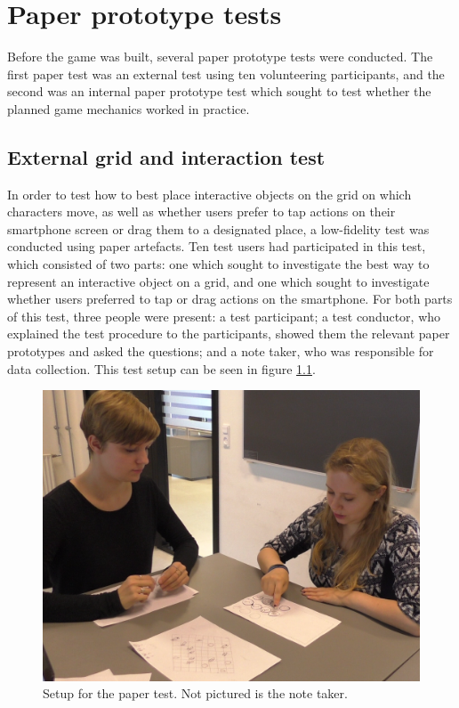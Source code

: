 \chapter{Paper prototype tests}\label{ch:paperPlaytest}
Before the game was built, several paper prototype tests were conducted. The first paper test was an external test using ten volunteering participants, and the second was an internal paper prototype test which sought to test whether the planned game mechanics worked in practice.

\section{External grid and interaction test}
In order to test how to best place interactive objects on the grid on which characters move, as well as whether users prefer to tap actions on their smartphone screen or drag them to a designated place, a low-fidelity test was conducted using paper artefacts. Ten test users had participated in this test, which consisted of two parts: one which sought to investigate the best way to represent an interactive object on a grid, and one which sought to investigate whether users preferred to tap or drag actions on the smartphone. For both parts of this test, three people were present: a test participant; a test conductor, who explained the test procedure to the participants, showed them the relevant paper prototypes and asked the questions; and a note taker, who was responsible for data collection. This test setup can be seen in figure \ref{fig:papersetup}.

\begin{figure}[h!]
	\centering
	\includegraphics[width=\textwidth / 2]{figures/PaperTestSetup.png}
	\caption{Setup for the paper test. Not pictured is the note taker. \label{fig:papersetup}}
\end{figure}

